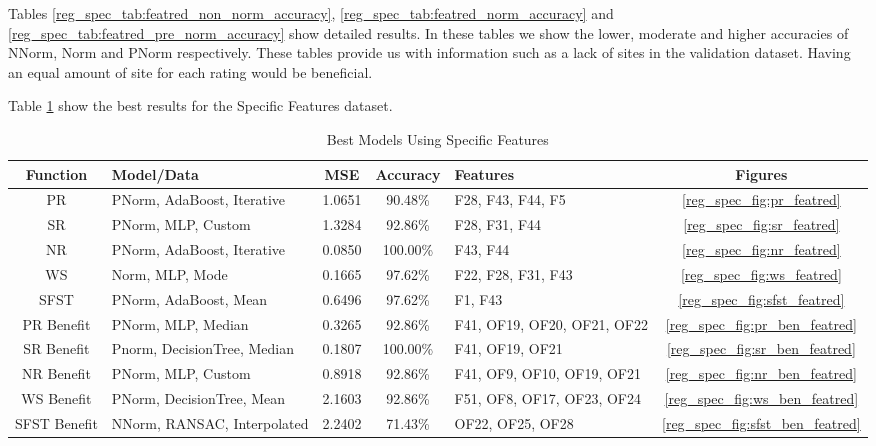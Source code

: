 \documentclass[12pt,letterpaper]{article}
\begin{document}
Tables \ref{reg_spec_tab:featred_non_norm_accuracy}, \ref{reg_spec_tab:featred_norm_accuracy} and \ref{reg_spec_tab:featred_pre_norm_accuracy} show detailed results.
In these tables we show the lower, moderate and higher accuracies of NNorm, Norm and PNorm respectively.
These tables provide us with information such as a lack of sites in the validation dataset.
Having an equal amount of site for each rating would be beneficial.



Table \ref{reg_spec_tab:best} show the best results for the Specific Features dataset.
\begin{table}[H]
\centering
\begin{tabular}{|c|p{3cm}|c|c|p{3cm}|c|}
\hline
\textbf{Function} & \textbf{Model/Data} & \textbf{MSE} & \textbf{Accuracy} & \textbf{Features} & \textbf{Figures}  \\
\hline
 PR & PNorm, AdaBoost, Iterative & 1.0651 & 90.48\% & F28, F43, F44, F5 &\ref{reg_spec_fig:pr_featred} \\
\hline
 SR & PNorm, MLP, Custom & 1.3284 & 92.86\% & F28, F31, F44 & \ref{reg_spec_fig:sr_featred} \\
\hline
 NR & PNorm, AdaBoost, Iterative & 0.0850 & 100.00\% & F43, F44 & \ref{reg_spec_fig:nr_featred} \\
\hline
 WS & Norm, MLP, Mode & 0.1665 & 97.62\% & F22, F28, F31, F43 & \ref{reg_spec_fig:ws_featred}\\
\hline
 SFST & PNorm, AdaBoost, Mean & 0.6496 & 97.62\% & F1, F43 & \ref{reg_spec_fig:sfst_featred}\\
\hline
 PR Benefit & PNorm, MLP, Median & 0.3265 & 92.86\% & F41, OF19, OF20, OF21, OF22 & \ref{reg_spec_fig:pr_ben_featred}\\
\hline
SR Benefit & Pnorm, DecisionTree, Median & 0.1807 & 100.00\% & F41, OF19, OF21 & \ref{reg_spec_fig:sr_ben_featred}\\
\hline
 NR Benefit & PNorm, MLP, Custom & 0.8918 & 92.86\% & F41, OF9, OF10, OF19, OF21 & \ref{reg_spec_fig:nr_ben_featred}\\
\hline
 WS Benefit & PNorm, DecisionTree, Mean & 2.1603 & 92.86\% & F51, OF8, OF17, OF23, OF24 & \ref{reg_spec_fig:ws_ben_featred}\\
\hline
 SFST Benefit & NNorm, RANSAC, Interpolated & 2.2402 & 71.43\% & OF22, OF25, OF28 & \ref{reg_spec_fig:sfst_ben_featred} \\
\hline
\end{tabular}
\caption{Best Models Using Specific Features}
\label{reg_spec_tab:best}
\end{table}
\end{document}
